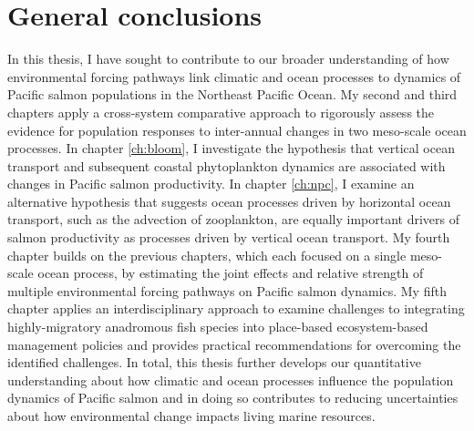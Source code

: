 
\chapter[General conclusions]{General conclusions}
\label{ch:conclude}

In this thesis, I have sought to contribute to our broader understanding of how
environmental forcing pathways link climatic and ocean processes to dynamics of
Pacific salmon populations in the Northeast Pacific Ocean. My second and third
chapters apply a cross-system comparative approach to rigorously assess the
evidence for population responses to inter-annual changes in two meso-scale
ocean processes. In chapter \ref{ch:bloom}, I investigate the hypothesis that
vertical ocean transport and subsequent coastal phytoplankton dynamics are
associated with changes in Pacific salmon productivity. In chapter \ref{ch:npc},
I examine an alternative hypothesis that suggests ocean processes driven by
horizontal ocean transport, such as the advection of zooplankton, are equally
important drivers of salmon productivity as processes driven by vertical ocean
transport. My fourth chapter builds on the previous chapters, which each focused
on a single meso-scale ocean process, by estimating the joint effects and
relative strength of multiple environmental forcing pathways on Pacific salmon
dynamics. My fifth chapter applies an interdisciplinary approach to examine
challenges to integrating highly-migratory anadromous fish species into
place-based ecosystem-based management policies and provides practical
recommendations for overcoming the identified challenges. In total, this thesis
further develops our quantitative understanding about how climatic and ocean
processes influence the population dynamics of Pacific salmon and in doing so
contributes to reducing uncertainties about how environmental change impacts
living marine resources.

